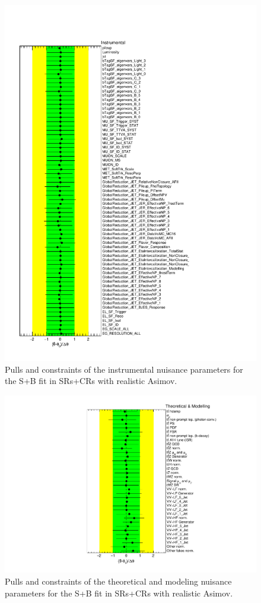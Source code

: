\begin{figure}[htbp]
	\centering
	\includegraphics[width=.8\textwidth]{Chapters/CH8/figures/SPLUSB_CRSR_UsingDL1rcFullSys/NuisPar_Instrumental}
	\caption{Pulls and constraints of the instrumental nuisance parameters for the S+B \tZc fit in SRs+CRs with realistic Asimov.}%
	\label{fig:stat:tzc:splusb:crsr:np:instr}
\end{figure}

\begin{figure}[htbp]
	\centering
	\includegraphics[width=.85\textwidth]{Chapters/CH8/figures/SPLUSB_CRSR_UsingDL1rcFullSys/NuisPar_Theoretical_&_Modelling}
	\caption{Pulls and constraints of the theoretical and modeling nuisance parameters for the S+B \tZc fit in SRs+CRs with realistic Asimov.}%
	\label{fig:stat:tzc:splusb:crsr:np:model}
\end{figure}

